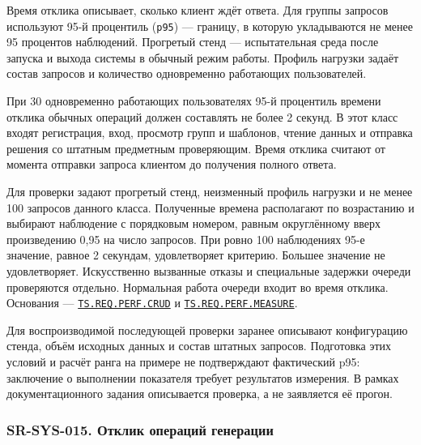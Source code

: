 \documentclass[12pt,a4paper]{article}
\begin{document}
\hypertarget{sr-sys-014-отклик-обычных-операций}{}

\hypertarget{sr-sys-014}{}

Время отклика описывает, сколько клиент ждёт ответа. Для группы запросов используют 95-й процентиль (\texttt{p95}) --- границу, в которую укладываются не менее 95 процентов наблюдений. Прогретый стенд --- испытательная среда после запуска и выхода системы в обычный режим работы. Профиль нагрузки задаёт состав запросов и количество одновременно работающих пользователей.

При 30 одновременно работающих пользователях 95-й процентиль времени отклика обычных операций должен составлять не более 2 секунд. В этот класс входят регистрация, вход, просмотр групп и шаблонов, чтение данных и отправка решения со штатным предметным проверяющим. Время отклика считают от момента отправки запроса клиентом до получения полного ответа.

Для проверки задают прогретый стенд, неизменный профиль нагрузки и не менее 100 запросов данного класса. Полученные времена располагают по возрастанию и выбирают наблюдение с порядковым номером, равным округлённому вверх произведению 0,95 на число запросов. При ровно 100 наблюдениях 95-е значение, равное 2 секундам, удовлетворяет критерию. Большее значение не удовлетворяет. Искусственно вызванные отказы и специальные задержки очереди проверяются отдельно. Нормальная работа очереди входит во время отклика. Основания --- {\href{../02\_Техническое\_задание/DOC-02\_Техническое\_задание.pdf\#ts-req-perf-crud}{\texttt{TS.\allowbreak{}REQ.\allowbreak{}PERF.\allowbreak{}CRUD}}} и {\href{../02\_Техническое\_задание/DOC-02\_Техническое\_задание.pdf\#ts-req-perf-measure}{\texttt{TS.\allowbreak{}REQ.\allowbreak{}PERF.\allowbreak{}MEASURE}}}.

Для воспроизводимой последующей проверки заранее описывают конфигурацию стенда, объём исходных данных и состав штатных запросов. Подготовка этих условий и расчёт ранга на примере не подтверждают фактический p95: заключение о выполнении показателя требует результатов измерения. В рамках документационного задания описывается проверка, а не заявляется её прогон.

\subsubsection{SR-SYS-015. Отклик операций генерации}\label{sr-sys-015-ux43eux442ux43aux43bux438ux43a-ux43eux43fux435ux440ux430ux446ux438ux439-ux433ux435ux43dux435ux440ux430ux446ux438ux438}
\end{document}
